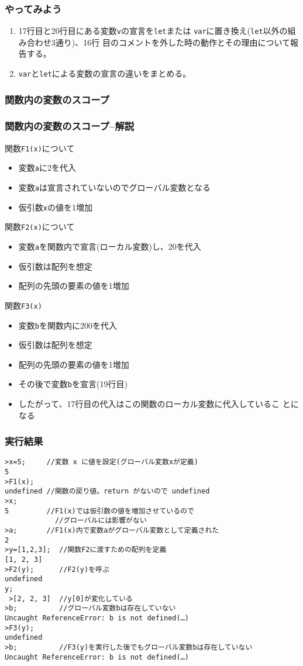 \begin{frame}[containsverbatim]
 \frametitle{やってみよう}
	\begin{enumerate}
	 \item 17行目と20行目にある変数\texttt{v}の宣言を\texttt{let}または
				 \texttt{var}に置き換え(\texttt{let}以外の組み合わせ3通り)、16行
				 目のコメントを外した時の動作とその理由について報告する。
	 \item \texttt{var}と\texttt{let}による変数の宣言の違いをまとめる。
	\end{enumerate}
	\end{frame}
 \begin{frame}[containsverbatim]
	\frametitle{関数内の変数のスコープ}
	\end{frame}
 \begin{frame}[containsverbatim]
 \frametitle{関数内の変数のスコープ--解説}
 関数\texttt{F1(x)}について
\begin{itemize}
 \item 変数\texttt{a}に2を代入
 \item 変数\texttt{a}は宣言されていないのでグローバル変数となる
 \item 仮引数\texttt{x}の値を1増加
\end{itemize}
 関数\texttt{F2(x)}について
 \begin{itemize}
	\item 変数\texttt{a}を関数内で宣言(ローカル変数)し、20を代入
	\item 仮引数は配列を想定
	\item 配列の先頭の要素の値を1増加
 \end{itemize}
 関数\texttt{F3(x)}
 \begin{itemize}
	\item 変数\texttt{b}を関数内に200を代入
	\item 仮引数は配列を想定
	\item 配列の先頭の要素の値を1増加
	\item その後で変数\texttt{b}を宣言(19行目)
	\item したがって、17行目の代入はこの関数のローカル変数に代入しているこ
				とになる
 \end{itemize}
 \end{frame}
\begin{frame}[containsverbatim]
 \frametitle{実行結果}
\begin{Verbatim}[fontsize=\footnotesize]
>x=5;     //変数 x に値を設定(グローバル変数xが定義)
5
>F1(x);
undefined //関数の戻り値。return がないので undefined
>x;
5         //F1(x)では仮引数の値を増加させているので
	        //グローバルには影響がない
>a;       //F1(x)内で変数aがグローバル変数として定義された
2
>y=[1,2,3];  //関数F2に渡すための配列を定義
[1, 2, 3]
>F2(y);      //F2(y)を呼ぶ
undefined
y;
 >[2, 2, 3]  //y[0]が変化している
>b;          //グローバル変数bは存在していない
Uncaught ReferenceError: b is not defined(…)
>F3(y);
undefined
>b;          //F3(y)を実行した後でもグローバル変数bは存在していない
Uncaught ReferenceError: b is not defined(…)
\end{Verbatim}
\end{frame}
